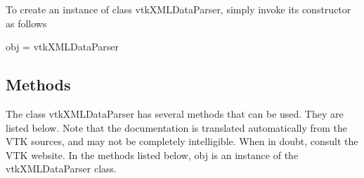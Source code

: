 To create an instance of class vtk\-X\-M\-L\-Data\-Parser, simply invoke its constructor as follows \begin{DoxyVerb}  obj = vtkXMLDataParser
\end{DoxyVerb}
 \hypertarget{vtkwidgets_vtkxyplotwidget_Methods}{}\subsection{Methods}\label{vtkwidgets_vtkxyplotwidget_Methods}
The class vtk\-X\-M\-L\-Data\-Parser has several methods that can be used. They are listed below. Note that the documentation is translated automatically from the V\-T\-K sources, and may not be completely intelligible. When in doubt, consult the V\-T\-K website. In the methods listed below, {\ttfamily obj} is an instance of the vtk\-X\-M\-L\-Data\-Parser class. 
